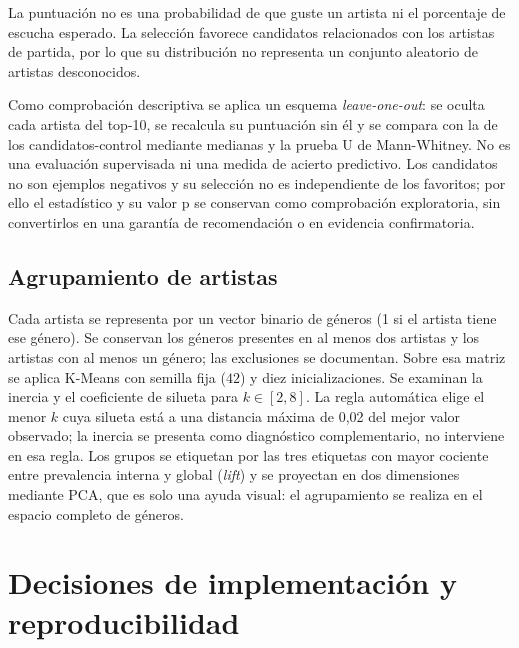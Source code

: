 La puntuación no es una probabilidad de que guste un artista ni el porcentaje de escucha esperado. La selección favorece candidatos relacionados con los artistas de partida, por lo que su distribución no representa un conjunto aleatorio de artistas desconocidos.

Como comprobación descriptiva se aplica un esquema \emph{leave-one-out}: se oculta cada artista del top-10, se recalcula su puntuación sin él y se compara con la de los candidatos-control mediante medianas y la prueba U de Mann-Whitney. No es una evaluación supervisada ni una medida de acierto predictivo. Los candidatos no son ejemplos negativos y su selección no es independiente de los favoritos; por ello el estadístico y su valor p se conservan como comprobación exploratoria, sin convertirlos en una garantía de recomendación o en evidencia confirmatoria.

\subsection{Agrupamiento de artistas}
\label{sec:clustering}

Cada artista se representa por un vector binario de géneros (1 si el artista tiene ese género). Se conservan los géneros presentes en al menos dos artistas y los artistas con al menos un género; las exclusiones se documentan. Sobre esa matriz se aplica K-Means con semilla fija ($42$) y diez inicializaciones. Se examinan la inercia y el coeficiente de silueta para $k \in [2,8]$. La regla automática elige el menor $k$ cuya silueta está a una distancia máxima de 0,02 del mejor valor observado; la inercia se presenta como diagnóstico complementario, no interviene en esa regla. Los grupos se etiquetan por las tres etiquetas con mayor cociente entre prevalencia interna y global (\emph{lift}) y se proyectan en dos dimensiones mediante PCA, que es solo una ayuda visual: el agrupamiento se realiza en el espacio completo de géneros.

\section{Decisiones de implementación y reproducibilidad}
\label{sec:reproducibilidad-modelo}

